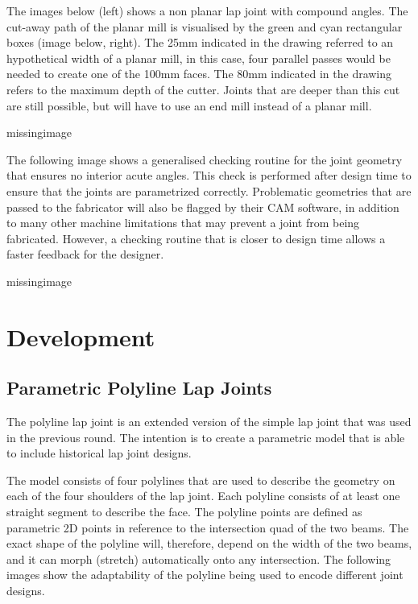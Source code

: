 The images below (left) shows a non planar lap joint with compound angles. The cut-away path of the planar mill is visualised by the green and cyan rectangular boxes (image below, right). The 25mm indicated in the drawing referred to an hypothetical width of a planar mill, in this case, four parallel passes would be needed to create one of the 100mm faces. The 80mm indicated in the drawing refers to the maximum depth of the cutter. Joints that are deeper than this cut are still possible, but will have to use an end mill instead of a planar mill.

missingimage

The following image shows a generalised checking routine for the joint geometry that ensures no interior acute angles. This check is performed after design time to ensure that the joints are parametrized correctly. Problematic geometries that are passed to the fabricator will also be flagged by their CAM software, in addition to many other machine limitations that may prevent a joint from being fabricated. However, a checking routine that is closer to design time allows a faster feedback for the designer.

missingimage

\section{Development}
\label{section:exploration-4-development}

\subsection{Parametric Polyline Lap Joints}
\label{subsection:exploration-4-parametric-polyline-lap-joints}

The polyline lap joint is an extended version of the simple lap joint that was used in the previous round. The intention is to create a parametric model that is able to include historical lap joint designs.

The model consists of four polylines that are used to describe the geometry on each of the four shoulders of the lap joint. Each polyline consists of at least one straight segment to describe the face. The polyline points are defined as parametric 2D points in reference to the intersection quad of the two beams. The exact shape of the polyline will, therefore, depend on the width of the two beams, and it can morph (stretch) automatically onto any intersection. The following images show the adaptability of the polyline being used to encode different joint designs.

